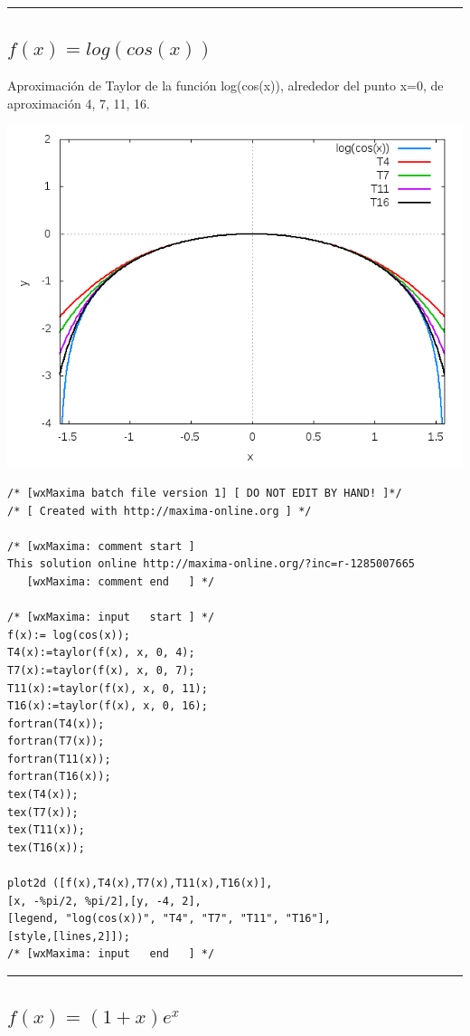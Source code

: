 \documentclass{article}
\begin{document}
\noindent\rule{\textwidth}{1pt}



\subsection{$f(x)= log(cos(x))$}

Aproximaci\'on de Taylor de la funci\'on log(cos(x)), alrededor del punto  x=0, de aproximaci\'on 4, 7, 11, 16.


\includegraphics[scale=.5]{logcos}

\begin{Verbatim}[frame=single]
/* [wxMaxima batch file version 1] [ DO NOT EDIT BY HAND! ]*/
/* [ Created with http://maxima-online.org ] */

/* [wxMaxima: comment start ]
This solution online http://maxima-online.org/?inc=r-1285007665
   [wxMaxima: comment end   ] */

/* [wxMaxima: input   start ] */
f(x):= log(cos(x));
T4(x):=taylor(f(x), x, 0, 4);
T7(x):=taylor(f(x), x, 0, 7);
T11(x):=taylor(f(x), x, 0, 11);
T16(x):=taylor(f(x), x, 0, 16);
fortran(T4(x));
fortran(T7(x));
fortran(T11(x));
fortran(T16(x));
tex(T4(x));
tex(T7(x));
tex(T11(x));
tex(T16(x));

plot2d ([f(x),T4(x),T7(x),T11(x),T16(x)],
[x, -%pi/2, %pi/2],[y, -4, 2],
[legend, "log(cos(x))", "T4", "T7", "T11", "T16"],
[style,[lines,2]]);
/* [wxMaxima: input   end   ] */
\end{Verbatim}

\noindent\rule{\textwidth}{1pt}


\subsection{$f(x)= (1+x)e^x$}
\end{document}
